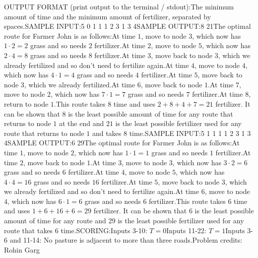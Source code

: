 \documentclass[12pt]{article}
\begin{document}
OUTPUT FORMAT (print output to the terminal / stdout):The minimum amount of time and the minimum amount of fertilizer, separated by
spaces.SAMPLE INPUT:5 0
1 1
1 2
3 1
3 4SAMPLE OUTPUT:8 21The optimal route for Farmer John is as follows:At time $1$, move to node $3$, which now has $1 \cdot 2 = 2$ grass and so
needs $2$ fertilizer.At time $2$, move to node $5$, which now has
$2 \cdot 4 = 8$ grass and so needs $8$ fertilizer.At time $3$, move
back to node $3$, which we already fertilized and so don't need to fertilize
again.At time $4$, move to node $4$, which now has $4 \cdot 1 = 4$
grass and so needs $4$ fertilizer.At time $5$, move back to node $3$,
which we already fertilized.At time $6$, move back to node $1$.At time $7$, move to node $2$, which now has $7 \cdot 1 = 7$ grass
and so needs $7$ fertilizer.At time $8$, return to node $1$.This route takes $8$ time and uses $2 + 8 + 4 + 7 = 21$ fertilizer. It can be
shown that $8$ is the least possible amount of time for any route that returns
to node $1$ at the end and $21$ is the least possible fertilizer used for any
route that returns to node $1$ and takes $8$ time.SAMPLE INPUT:5 1
1 1
1 2
3 1
3 4SAMPLE OUTPUT:6 29The optimal route for Farmer John is as follows:At time $1$, move to node $2$, which now has $1 \cdot 1 = 1$ grass and so
needs $1$ fertilizer.At time $2$, move back to node $1$.At time $3$, move to node $3$, which now has $3 \cdot 2 = 6$ grass and so needs
$6$ fertilizer.At time $4$, move to node $5$, which now has
$4 \cdot 4 = 16$ grass and so needs $16$ fertilizer.At time $5$,
move back to node $3$, which we already fertilized and so don't need to
fertilize again.At time $6$, move to node $4$, which now has
$6 \cdot 1 = 6$ grass and so needs $6$ fertilizer.This route takes $6$ time and uses $1 + 6 + 16 + 6 = 29$ fertilizer. It can be
shown that $6$ is the least possible amount of time for any route and $29$ is
the least possible fertilizer used for any route that takes $6$ time.SCORING:Inputs 3-10: $T=0$Inputs 11-22: $T=1$Inputs 3-6 and 11-14: No pasture is adjacent to more than three roads.Problem credits: Rohin Garg
\end{document}
